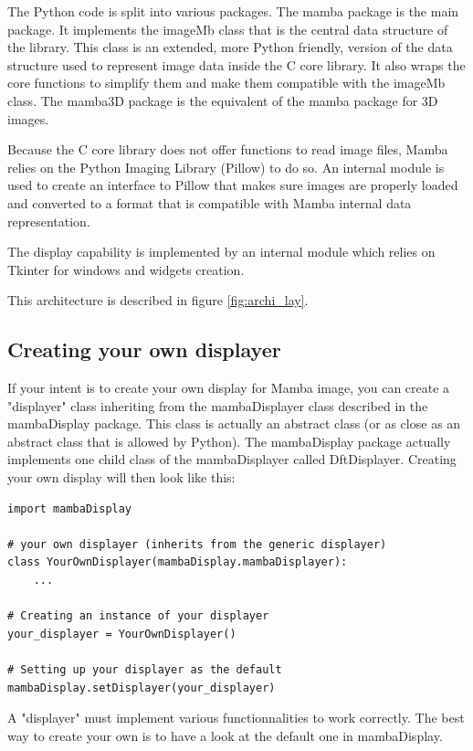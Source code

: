 \documentclass[a4paper,10pt,oneside]{article}
\begin{document}
The Python code is split into various packages. The mamba package is the 
main package. It implements the imageMb class that is the
central data structure of the library. This class is an extended, more Python
friendly, version of the data structure used to represent image data inside the
C core library. It also wraps the core functions to simplify them
and make them compatible with the imageMb class. The mamba3D package is the
equivalent of the mamba package for 3D images.

Because the C core library does not offer functions to read image files, Mamba
relies on the Python Imaging Library (Pillow) to do so. An internal module is used
to create an interface to Pillow that makes sure images are properly loaded and
converted to a format that is compatible with Mamba internal data representation.

The display capability is implemented by an internal module which relies on
Tkinter for windows and widgets creation.

This architecture is described in figure \ref{fig:archi_lay}.

\subsection{Creating your own displayer}
\label{cha:create_own_disp}

If your intent is to create your own display for Mamba image, you can create
a "displayer" class inheriting from the mambaDisplayer class described in the
mambaDisplay package. This class is actually an abstract class (or as close
as an abstract class that is allowed by Python). The mambaDisplay package
actually implements one child class of the mambaDisplayer called DftDisplayer.
Creating your own display will then look like this:

\lstset{language=Python}
\begin{lstlisting}
import mambaDisplay

# your own displayer (inherits from the generic displayer)
class YourOwnDisplayer(mambaDisplay.mambaDisplayer):
    ...
    
# Creating an instance of your displayer
your_displayer = YourOwnDisplayer()

# Setting up your displayer as the default
mambaDisplay.setDisplayer(your_displayer)
\end{lstlisting}

A "displayer" must implement various functionnalities to work correctly. The 
best way to create your own is to have a look at the default one in mambaDisplay.
\end{document}
